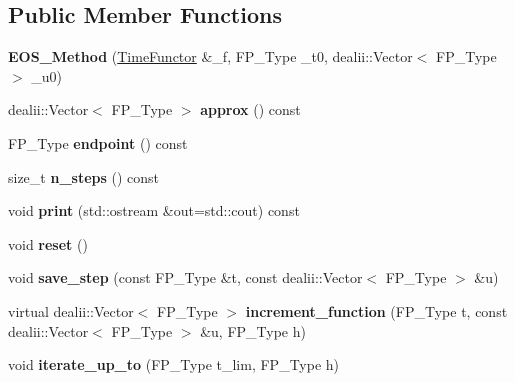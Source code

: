 \subsection*{Public Member Functions}
\begin{DoxyCompactItemize}
\item 
\mbox{\label{classEOS__Method_a531d5ee86fcad27fa2299e320417ed26}} 
{\bfseries E\+O\+S\+\_\+\+Method} (\hyperlink{classTimeFunctor}{Time\+Functor} \&\+\_\+f, F\+P\+\_\+\+Type \+\_\+t0, dealii\+::\+Vector$<$ F\+P\+\_\+\+Type $>$ \+\_\+u0)
\item 
\mbox{\label{classEOS__Method_a51157a38f285e475337c4e67d1ccd279}} 
dealii\+::\+Vector$<$ F\+P\+\_\+\+Type $>$ {\bfseries approx} () const
\item 
\mbox{\label{classEOS__Method_a3f7157f6b6518ea3395f90b3c5a795b8}} 
F\+P\+\_\+\+Type {\bfseries endpoint} () const
\item 
\mbox{\label{classEOS__Method_aa323926fa9f41a8a011c1a370c2bed7d}} 
size\+\_\+t {\bfseries n\+\_\+steps} () const
\item 
\mbox{\label{classEOS__Method_ae7f7cd39eddbc7dde0c004773c00ad6e}} 
void {\bfseries print} (std\+::ostream \&out=std\+::cout) const
\item 
\mbox{\label{classEOS__Method_a2abc87316deb095a84ed74e1ddfd56ec}} 
void {\bfseries reset} ()
\item 
\mbox{\label{classEOS__Method_a8f1d297e535ca2ca7441bafcea43742c}} 
void {\bfseries save\+\_\+step} (const F\+P\+\_\+\+Type \&t, const dealii\+::\+Vector$<$ F\+P\+\_\+\+Type $>$ \&u)
\item 
\mbox{\label{classEOS__Method_a71f54df232ff780bc731b57d24b9f62e}} 
virtual dealii\+::\+Vector$<$ F\+P\+\_\+\+Type $>$ {\bfseries increment\+\_\+function} (F\+P\+\_\+\+Type t, const dealii\+::\+Vector$<$ F\+P\+\_\+\+Type $>$ \&u, F\+P\+\_\+\+Type h)
\item 
\mbox{\label{classEOS__Method_a2b2f44ec8d634b8eec6ec51f35425333}} 
void {\bfseries iterate\+\_\+up\+\_\+to} (F\+P\+\_\+\+Type t\+\_\+lim, F\+P\+\_\+\+Type h)
\end{DoxyCompactItemize}

